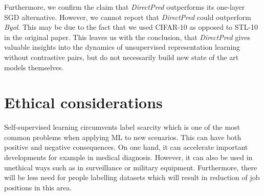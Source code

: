Furthermore, we confirm the claim that \emph{DirectPred} outperforms its one-layer SGD alternative. However, we cannot report that \emph{DirectPred} could outperform \emph{Byol}. This may be due to the fact that we used CIFAR-10 as opposed to STL-10 in the original paper. This leaves us with the conclusion, that \emph{DirectPred} gives valuable insights into the dynamics of unsupervised representation learning without contrastive pairs, but do not necessarily build new state of the art models themselves. 

\section{Ethical considerations}
\label{sec:ethics}

Self-supervised learning circumvents label scarcity which is one of the most common problems when applying ML to new scenarios. This can have both positive and negative consequences. On one hand, it can accelerate important developments for example in medical diagnosis. However, it can also be used in unethical ways such as in surveillance or military equipment. Furthermore, there will be less need for people labelling datasets which will result in reduction of job positions in this area. 







